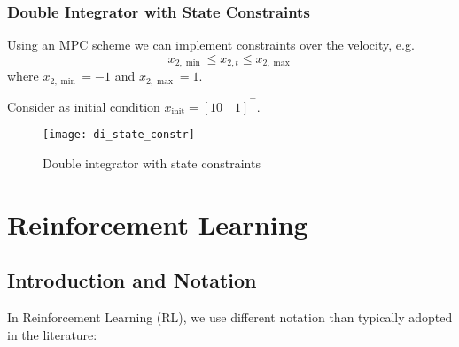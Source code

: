 \documentclass[openany]{book}
\theoremstyle{definition}
\theoremstyle{remark}
\begin{document}
\subsection{Double Integrator with State Constraints}
Using an MPC scheme we can implement constraints over the velocity, e.g.
\[
x_{2,\min} \leq x_{2,t} \leq x_{2,\max}
\]
where $x_{2,\min} = -1$ and $x_{2,\max} = 1$.

Consider as initial condition $x_{\text{init}} = [10 \quad 1]^\top$.

\begin{figure}[ht]
    \centering
    \texttt{[image: di\_state\_constr]}
    \caption{Double integrator with state constraints}
    \label{fig:di_state_constr}
\end{figure}


\chapter{Reinforcement Learning}

\section{Introduction and Notation}
In Reinforcement Learning (RL), we use different notation than typically adopted in the literature:
\end{document}
